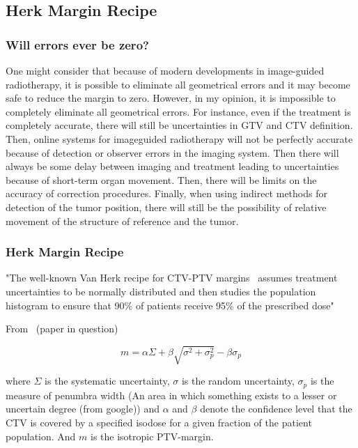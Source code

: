 \documentclass[11pt]{article}
\begin{document}
\subsection{Herk Margin Recipe}\label{term:herk-margin-recipe}

\subsubsection{Will errors ever be zero?}

One might consider that because of modern developments in image-guided radiotherapy, it is possible to eliminate all geometrical errors and it may become safe to reduce the margin to zero. However, in my opinion, it is impossible to completely eliminate all geometrical errors. For instance, even if the treatment is completely accurate, there will still be uncertainties in GTV and CTV definition. Then, online systems for imageguided radiotherapy will not be perfectly accurate because of detection or observer errors in the imaging system. Then there will always be some delay between imaging and treatment leading to uncertainties because of short-term organ movement. Then, there will be limits on the accuracy of correction procedures. Finally, when using indirect methods for detection of the tumor position, there will still be the possibility of relative movement of the structure of reference and the tumor.~\cite{VANHERK200452}

\subsubsection{Herk Margin Recipe}

"The well-known Van Herk recipe for CTV-PTV margins~\cite{VANHERK20001121} assumes treatment uncertainties to be normally distributed and then studies the population histogram to ensure that 90\% of patients receive 95\% of the prescribed dose"~\cite{Janssen2022-lr}~\cite{VANHERK20001121}

From~\cite{personalised-PTV-strategies} (paper in question)

\begin{equation}
    m = \alpha \Sigma + \beta \sqrt{\sigma^2 + \sigma^2_p} - \beta \sigma_p
\end{equation}

where $\Sigma$ is the systematic uncertainty, $\sigma$ is the random uncertainty, $\sigma_p$ is the measure of penumbra width (An area in which something exists to a lesser or uncertain degree (from google)) and $\alpha$ and $\beta$ denote the confidence level that the CTV is covered by a specified isodose for a given fraction of the patient population. And $m$ is the isotropic PTV-margin.
\end{document}

